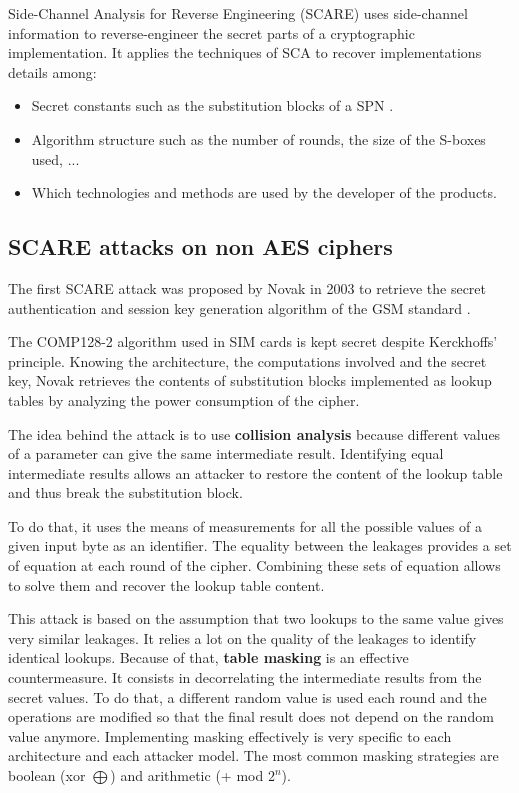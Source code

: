 \documentclass[11pt]{sdm}
\begin{document}
Side-Channel Analysis for Reverse Engineering (SCARE) uses side-channel information to reverse-engineer the secret parts of a cryptographic implementation.
It applies the techniques of SCA to recover implementations details among:
\begin{itemize}
    \item Secret constants such as the substitution blocks of a SPN \parencite{Novak_2003}.
    \item Algorithm structure such as the number of rounds, the size of the S-boxes used, ...
    \item Which technologies and methods are used by the developer of the products.
\end{itemize}

\subsection{SCARE attacks on non AES ciphers}
\label{scare_non_aes}

The first SCARE attack was proposed by Novak in 2003 to retrieve the secret authentication and session key generation algorithm of the GSM standard \parencite{Novak_2003}.

The COMP128-2 algorithm used in SIM cards is kept secret despite Kerckhoffs' principle.
Knowing the architecture, the computations involved and the secret key, Novak retrieves the contents of substitution blocks implemented as lookup tables by analyzing the power consumption of the cipher.

The idea behind the attack is to use \textbf{collision analysis} because different values of a parameter can give the same intermediate result.
Identifying equal intermediate results allows an attacker to restore the content of the lookup table and thus break the substitution block.

To do that, it uses the means of measurements for all the possible values of a given input byte as an identifier.
The equality between the leakages provides a set of equation at each round of the cipher.
Combining these sets of equation allows to solve them and recover the lookup table content.

This attack is based on the assumption that two lookups to the same value gives very similar leakages.
It relies a lot on the quality of the leakages to identify identical lookups.
Because of that, \textbf{table masking} is an effective countermeasure.
It consists in decorrelating the intermediate results from the secret values.
To do that, a different random value is used each round and the operations are modified so that the final result does not depend on the random value anymore.
Implementing masking effectively is very specific to each architecture and each attacker model.
The most common masking strategies are boolean (xor $\bigoplus$) and arithmetic (+ mod $2^n$). %
\end{document}
